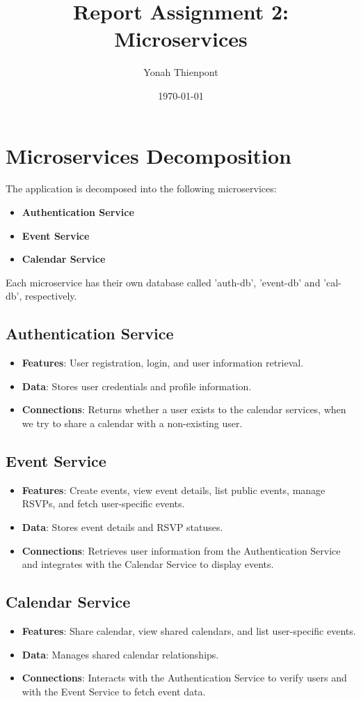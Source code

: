 \documentclass{article}
\title{Report Assignment 2: Microservices}
\author{Yonah Thienpont}
\date{\today}
\begin{document}
\maketitle

\section{Microservices Decomposition}
The application is decomposed into the following microservices:
\begin{itemize}
    \item \textbf{Authentication Service}
    \item \textbf{Event Service}
    \item \textbf{Calendar Service}
\end{itemize}
Each microservice has their own database called 'auth-db', 'event-db' and 'cal-db', respectively.

\subsection{Authentication Service}
\begin{itemize}
    \item \textbf{Features}: User registration, login, and user information retrieval.
    \item \textbf{Data}: Stores user credentials and profile information.
    \item \textbf{Connections}: Returns whether a user exists to the calendar services, when we try to share a calendar with a non-existing user.
\end{itemize}

\subsection{Event Service}
\begin{itemize}
    \item \textbf{Features}: Create events, view event details, list public events, manage RSVPs, and fetch user-specific events.
    \item \textbf{Data}: Stores event details and RSVP statuses.
    \item \textbf{Connections}: Retrieves user information from the Authentication Service and integrates with the Calendar Service to display events.
\end{itemize}

\subsection{Calendar Service}
\begin{itemize}
    \item \textbf{Features}: Share calendar, view shared calendars, and list user-specific events.
    \item \textbf{Data}: Manages shared calendar relationships.
    \item \textbf{Connections}: Interacts with the Authentication Service to verify users and with the Event Service to fetch event data.
\end{itemize}
\end{document}
